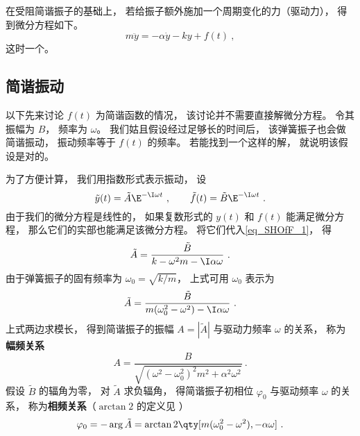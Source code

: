 

在受阻简谐振子的基础上， 若给振子额外施加一个周期变化的力（驱动力）， 得到微分方程如下。
\begin{equation}\label{eq_SHOfF_1}
m\ddot y = -\alpha \dot y - ky + f(t)~,
\end{equation}
这时一个。

\subsection{简谐振动}
以下先来讨论 $f(t)$ 为简谐函数的情况， 该讨论并不需要直接解微分方程。 令其振幅为 $B$， 频率为 $\omega$。 我们姑且假设经过足够长的时间后， 该弹簧振子也会做简谐振动， 振动频率等于 $f(t)$ 的频率。 若能找到一个这样的解， 就说明该假设是对的。

为了方便计算， 我们用指数形式表示振动， 设
\begin{equation}
\tilde y(t) = \tilde A\E^{-\I\omega t} ~,\qquad
\tilde f(t) = \tilde B\E^{-\I \omega t}~.
\end{equation}
由于我们的微分方程是线性的， 如果复数形式的 $y(t)$ 和 $f(t)$ 能满足微分方程， 那么它们的实部也能满足该微分方程。 将它们代入\autoref{eq_SHOfF_1}， 得
\begin{equation}
\tilde A =  \frac{\tilde B}{k -\omega^2 m - \I\alpha\omega}~.
\end{equation}
由于弹簧振子的固有频率为 $\omega_0 = \sqrt{k/m}$， 上式可用 $\omega_0$ 表示为
\begin{equation}
\tilde A = \frac{\tilde B}{m(\omega_0^2 - \omega^2) - \I\alpha\omega}~.
\end{equation}
上式两边求模长， 得到简谐振子的振幅 $A = |\tilde A|$ 与驱动力频率 $\omega$ 的关系， 称为\textbf{幅频关系}
\begin{equation}\label{eq_SHOfF_5}
A = \frac{B}{\sqrt{(\omega^2 - \omega_0^2)^2 m^2 + \alpha^2\omega^2}}~.
\end{equation}
假设 $\tilde B$ 的辐角为零， 对 $\tilde A$ 求负辐角， 得简谐振子初相位 $\varphi_0$ 与驱动频率 $\omega$ 的关系， 称为\textbf{相频关系}（$\arctan2$ 的定义见%
）
\begin{equation}\label{eq_SHOfF_6}
\varphi_0 = -\arg \tilde A = \arctan2 \qty[m(\omega_0^2 - \omega^2), -\alpha\omega]~.
\end{equation}


